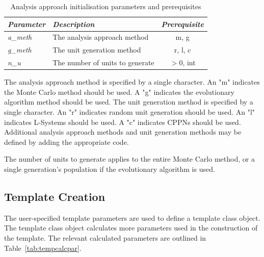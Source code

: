 \begin{table}[H]
\centering
\caption{Analysis approach initialisation parameters and prerequisites}
\label{tab:analpar}
\begin{tabular}{@{}llc@{}}
\toprule
\textit{\textbf{Parameter}} & \textit{\textbf{Description}} & \multicolumn{1}{l}{\textit{\textbf{Prerequisite}}} \\ \midrule
\textit{a\_meth} & The analysis approach method    & m, g      \\
\textit{g\_meth} & The unit generation method      & r, l, c   \\
\textit{n\_u}    & The number of units to generate & $>0$, int \\ \bottomrule
\end{tabular}
\end{table}

The analysis approach method is specified by a single character. An "m" indicates the Monte Carlo method should be used. A "g" indicates the evolutionary algorithm method should be used. The unit generation method is specified by a single character. An "r" indicates random unit generation should be used. An "l" indicates L-Systems should be used. A "c" indicates CPPNs should be used. Additional analysis approach methods and unit generation methods may be defined by adding the appropriate code.

The number of units to generate applies to the entire Monte Carlo method, or a single generation's population if the evolutionary algorithm is used.

\subsection{Template Creation}
\label{ssec:tempcr}

The user-specified template parameters are used to define a template class object. The template class object calculates more parameters used in the construction of the template. The relevant calculated parameters are outlined in Table~\ref{tab:tempcalcpar}.

